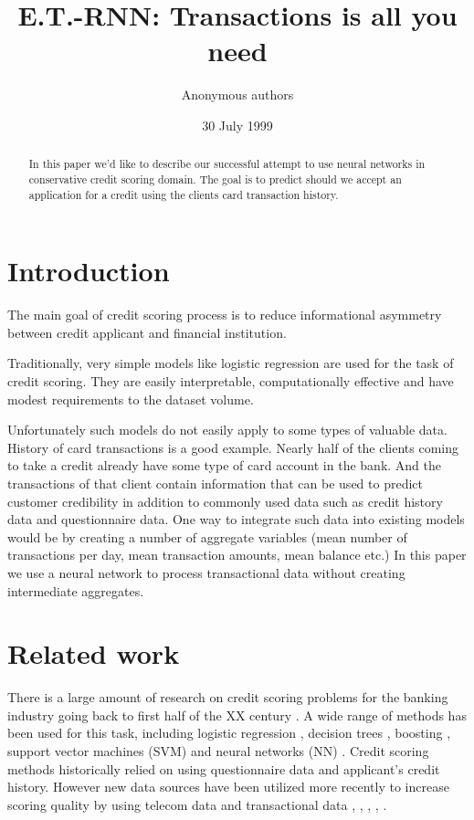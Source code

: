 \documentclass[sigconf]{acmart}
\begin{document}
\title{E.T.-RNN: Transactions is all you need}

\author{Anonymous authors}

\date{30 July 1999}

\begin{abstract}
In this paper we'd like to describe our successful attempt to use neural networks in conservative credit scoring domain.
The goal is to predict should we accept an application for a credit using the clients card transaction history.
\end{abstract}

\maketitle

\section{Introduction}

The main goal of credit scoring process is to reduce informational asymmetry between credit applicant and financial institution.

Traditionally, very simple models like logistic regression are used for the task of credit scoring. They are easily interpretable, computationally effective and have modest requirements to the dataset volume.

Unfortunately such models do not easily apply to some types of valuable data. History of card transactions is a good example. Nearly half of the clients coming to take a credit already have some type of card account in the bank. And the transactions of that client contain information that can be used to predict customer credibility in addition to commonly used data such as credit history data and questionnaire data. One way to integrate such data into existing models would be by creating a number of aggregate variables (mean number of transactions per day, mean transaction amounts, mean balance etc.) In this paper we use a neural network to process transactional data without creating intermediate aggregates.

\section{Related work} \label{sec-rw}

There is a large amount of research on credit scoring problems for the banking industry going back to first half of the XX century \cite{NBERc12952}. A wide range of methods has been used for this task, including logistic regression \cite{RePEc:cup:jfinqa:v:15:y:1980:i:03:p:757-770_00}, decision trees \cite{makowski1985credit}, boosting \cite{bastos2007credit}, support vector machines (SVM) \cite{HUANG2007847} and neural networks (NN) \cite{west2000neural}. Credit scoring methods historically relied on using questionnaire data and applicant's credit history. However new data sources have been utilized more recently to increase scoring quality by using telecom data \cite{bjorkegren2017behavior} and transactional data \cite{khandani2010consumer}, \cite{bellotti2013forecasting}, \cite{KVAMME2018207}, \cite{chi2012hybrid}, \cite{RePEc}.
\end{document}
